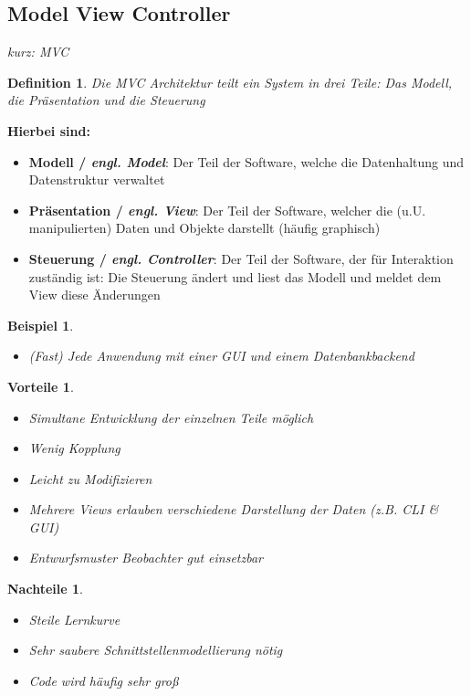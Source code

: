 \documentclass[a4paper]{article}
\theoremstyle{break}
\newtheorem{defi}{Definition}[section]
\newtheorem{ex}{Beispiel}[section]
\newtheorem{why}{Vorteile}[section]
\newtheorem{whynot}{Nachteile}[section]
\begin{document}
\subsection{Model View Controller}
\textit{kurz: MVC}
\begin{defi}
	Die MVC Architektur teilt ein System in drei Teile: Das Modell, die Präsentation und die Steuerung
\end{defi}
\textbf{Hierbei sind:}
\begin{itemize}
	\item \textbf{Modell / \textit{engl. Model}}: Der Teil der Software, welche die Datenhaltung und Datenstruktur verwaltet
	\item \textbf{Präsentation / \textit{engl. View}}: Der Teil der Software, welcher die (u.U. manipulierten) Daten und Objekte darstellt (häufig graphisch)
	\item \textbf{Steuerung / \textit{engl. Controller}}: Der Teil der Software, der für Interaktion zuständig ist: Die Steuerung ändert und liest das Modell und meldet dem View diese Änderungen
\end{itemize}
\begin{ex}
	\begin{itemize}
		\item (Fast) Jede Anwendung mit einer GUI und einem Datenbankbackend  
	\end{itemize}
\end{ex}
\begin{why}
	\begin{itemize}
		\item Simultane Entwicklung der einzelnen Teile möglich
		\item Wenig Kopplung
		\item Leicht zu Modifizieren
		\item Mehrere Views erlauben verschiedene Darstellung der Daten (z.B. CLI \& GUI)
		\item Entwurfsmuster Beobachter gut einsetzbar
	\end{itemize}
\end{why}
\begin{whynot}
	\begin{itemize}
		\item Steile Lernkurve
		\item Sehr saubere Schnittstellenmodellierung nötig
		\item Code wird häufig sehr groß
	\end{itemize}
\end{whynot}
\end{document}
